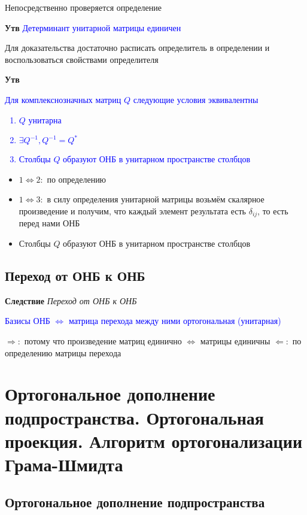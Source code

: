 \documentclass[a4paper, 14pt]{article}
\begin{document}
    Непосредственно проверяется определение

    \textbf{Утв} \textcolor{blue}{Детерминант унитарной матрицы единичен}

    Для доказательства достаточно расписать определитель в определении и воспользоваться свойствами определителя

    \textbf{Утв} \textcolor{blue}{Для комплекснозначных матриц $Q$ следующие условия эквивалентны
        \begin{enumerate}
            \item $Q$ унитарна
            \item $\exists Q^{-1},  Q^{-1} = Q^*$
            \item Столбцы $Q$ образуют ОНБ в унитарном пространстве столбцов
        \end{enumerate}               }

    \begin{itemize}
        \item $1 \Leftrightarrow 2:$ по определению
        \item $1 \Leftrightarrow 3:$ в силу определения унитарной матрицы возьмём скалярное произведение и получим,
        что каждый элемент результата есть $\delta_{ij}$, то есть перед нами ОНБ
        \item Столбцы $Q$ образуют ОНБ в унитарном пространстве столбцов
    \end{itemize}

    \subsection{Переход от ОНБ к ОНБ}

    \textbf{Следствие} \textit{Переход от ОНБ к ОНБ}

    \textcolor{blue}{Базисы ОНБ $\Leftrightarrow$ матрица перехода между ними ортогональная (унитарная)}

    $\Rightarrow:$ потому что произведение матриц единично $\Leftrightarrow$ матрицы единичны
    $\Leftarrow:$ по определению матрицы перехода

    \section{Ортогональное дополнение подпространства.
    Ортогональная проекция.
    Алгоритм ортогонализации Грама-Шмидта}

    \subsection{Ортогональное дополнение подпространства}
\end{document}
